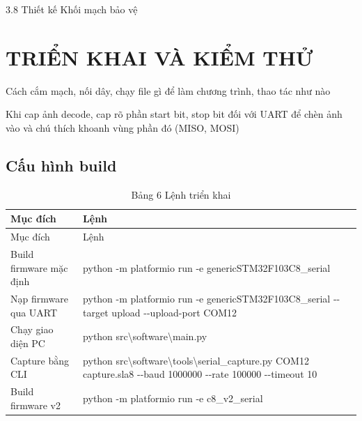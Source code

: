3.8 Thiết kế Khối mạch bảo vệ

\chapter{TRIỂN KHAI VÀ KIỂM THỬ}\label{triux1ec3n-khai-vuxe0-kiux1ec3m-thux1eed}

Cách cắm mạch, nối dây, chạy file gì để làm chương trình, thao tác như nào

Khi cap ảnh decode, cap rõ phần start bit, stop bit đối với UART để chèn ảnh vào và chú thích khoanh vùng phần đó (MISO, MOSI)

\section{Cấu hình build}\label{cux1ea5u-huxecnh-build}

\begin{longtable}[]{@{}
  >{\raggedright\arraybackslash}p{}
  >{\raggedright\arraybackslash}p{}@{}}
\caption{Bảng 6 Lệnh triển khai}\tabularnewline
\toprule\noalign{}
\begin{minipage}[b]{\linewidth}\raggedright
Mục đích
\end{minipage} & \begin{minipage}[b]{\linewidth}\raggedright
Lệnh
\end{minipage} \\
\midrule\noalign{}
\endfirsthead
\toprule\noalign{}
\begin{minipage}[b]{\linewidth}\raggedright
Mục đích
\end{minipage} & \begin{minipage}[b]{\linewidth}\raggedright
Lệnh
\end{minipage} \\
\midrule\noalign{}
\endhead
\bottomrule\noalign{}
\endlastfoot
Build firmware mặc định & python -m platformio run -e genericSTM32F103C8\_serial \\
Nạp firmware qua UART & python -m platformio run -e genericSTM32F103C8\_serial -\/-target upload -\/-upload-port COM12 \\
Chạy giao diện PC & python src\textbackslash software\textbackslash main.py \\
Capture bằng CLI & python src\textbackslash software\textbackslash tools\textbackslash serial\_capture.py COM12 capture.sla8 -\/-baud 1000000 -\/-rate 100000 -\/-timeout 10 \\
Build firmware v2 & python -m platformio run -e c8\_v2\_serial \\
\end{longtable}

